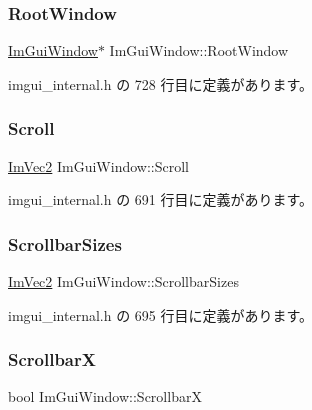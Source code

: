 \subsubsection{\texorpdfstring{Root\+Window}{RootWindow}}
{\footnotesize\ttfamily \mbox{\hyperlink{struct_im_gui_window}{Im\+Gui\+Window}}$\ast$ Im\+Gui\+Window\+::\+Root\+Window}



 imgui\+\_\+internal.\+h の 728 行目に定義があります。

\mbox{\label{struct_im_gui_window_abf20537560b9454a1e39667b8f9e7ff2}} 
\subsubsection{\texorpdfstring{Scroll}{Scroll}}
{\footnotesize\ttfamily \mbox{\hyperlink{struct_im_vec2}{Im\+Vec2}} Im\+Gui\+Window\+::\+Scroll}



 imgui\+\_\+internal.\+h の 691 行目に定義があります。

\mbox{\label{struct_im_gui_window_a040ebb8ac7de890df6cb6bfe048a72d5}} 
\subsubsection{\texorpdfstring{Scrollbar\+Sizes}{ScrollbarSizes}}
{\footnotesize\ttfamily \mbox{\hyperlink{struct_im_vec2}{Im\+Vec2}} Im\+Gui\+Window\+::\+Scrollbar\+Sizes}



 imgui\+\_\+internal.\+h の 695 行目に定義があります。

\mbox{\label{struct_im_gui_window_a5aeada04ca67b0522677f5cdf5c6b483}} 
\subsubsection{\texorpdfstring{ScrollbarX}{ScrollbarX}}
{\footnotesize\ttfamily bool Im\+Gui\+Window\+::\+ScrollbarX}



